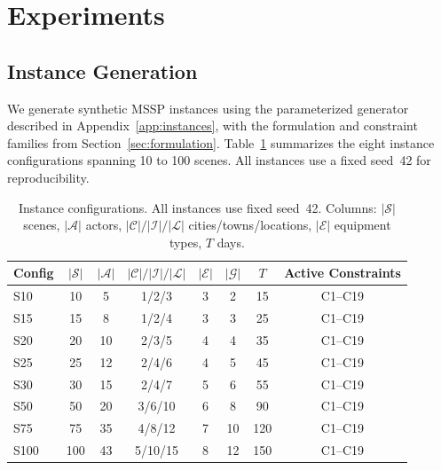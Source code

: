 \section{Experiments}
\label{sec:experiments}

\subsection{Instance Generation}

We generate synthetic MSSP instances using the parameterized generator described in Appendix~\ref{app:instances}, with the formulation and constraint families from Section~\ref{sec:formulation}.
Table~\ref{tab:instances} summarizes the eight instance configurations spanning 10 to 100 scenes.
All instances use a fixed seed~42 for reproducibility.

\begin{table}[h]
\centering
\caption{Instance configurations. All instances use fixed seed~42. Columns: $|\mathcal{S}|$ scenes, $|\mathcal{A}|$ actors, $|\mathcal{C}|/|\mathcal{I}|/|\mathcal{L}|$ cities/towns/locations, $|\mathcal{E}|$ equipment types, $T$ days.}
\label{tab:instances}
\small
\begin{tabular}{lccccccc}
\toprule
\textbf{Config} & $|\mathcal{S}|$ & $|\mathcal{A}|$ & $|\mathcal{C}|/|\mathcal{I}|/|\mathcal{L}|$ & $|\mathcal{E}|$ & $|\mathcal{G}|$ & $T$ & \textbf{Active Constraints} \\
\midrule
S10  & 10  & 5   & 1/2/3   & 3  & 2 & 15  & C1--C19 \\
S15  & 15  & 8   & 1/2/4   & 3  & 3 & 25  & C1--C19 \\
S20  & 20  & 10  & 2/3/5   & 4  & 4 & 35  & C1--C19 \\
S25  & 25  & 12  & 2/4/6   & 4  & 5 & 45  & C1--C19 \\
S30  & 30  & 15  & 2/4/7   & 5  & 6 & 55  & C1--C19 \\
S50  & 50  & 20  & 3/6/10  & 6  & 8 & 90  & C1--C19 \\
S75  & 75  & 35  & 4/8/12  & 7  & 10& 120 & C1--C19 \\
S100 & 100 & 43  & 5/10/15 & 8  & 12& 150 & C1--C19 \\
\bottomrule
\end{tabular}
\end{table}

